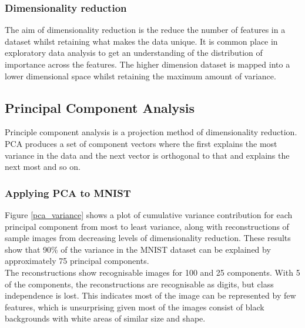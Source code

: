 \documentclass[11pt]{article}
\begin{document}
\subsubsection{Dimensionality reduction}

The aim of dimensionality reduction is the reduce the number of features in a dataset whilst retaining what makes the data unique. It is common place in exploratory data analysis to get an understanding of the distribution of importance across the features. The higher dimension dataset is mapped into a lower dimensional space whilst retaining the maximum amount of variance.


\subsection{Principal Component Analysis}
\label{pca}

Principle component analysis is a projection method of dimensionality reduction. PCA produces a set of component vectors where the first explains the most variance in the data and the next vector is orthogonal to that and explains the next most and so on.

\subsubsection{Applying PCA to MNIST}

Figure \ref{pca_variance} shows a plot of cumulative variance contribution for each principal component from most to least variance, along with reconstructions of sample images from decreasing levels of dimensionality reduction. These results show that 90\% of the variance in the MNIST dataset can be explained by approximately 75 principal components. \\

The reconstructions show recognisable images for 100 and 25 components. With 5 of the components, the reconstructions are recognisable as digits, but class independence is lost. This indicates most of the image can be represented by few features, which is unsurprising given most of the images consist of black backgrounds with white areas of similar size and shape.
\end{document}
